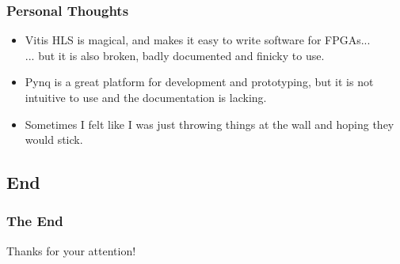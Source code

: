 \documentclass{beamer}
\begin{document}
\begin{frame}
    \frametitle{Personal Thoughts}

    \begin{itemize}
         \item Vitis HLS is magical, and makes it easy to write software for FPGAs...\\... but it is also broken, badly documented and finicky to use.
         \item Pynq is a great platform for development and prototyping, but it is not intuitive to use and the documentation is lacking.
         \item Sometimes I felt like I was just throwing things at the wall and hoping they would stick.
    \end{itemize}
\end{frame}

\subsection{End}
\begin{frame}
    \frametitle{The End}

    \large Thanks for your attention!
\end{frame}
\end{document}
